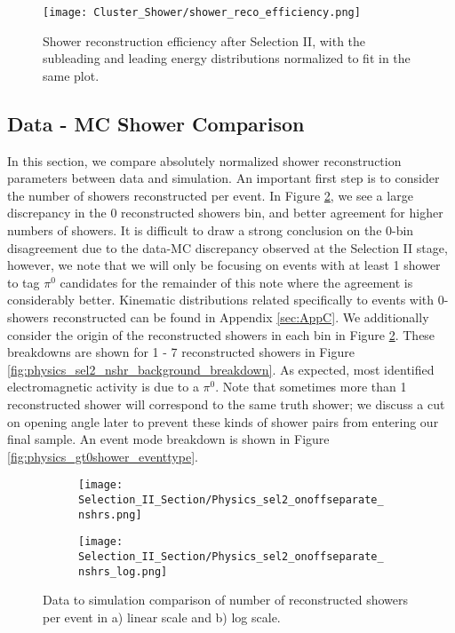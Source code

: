 \begin{figure}[h!]
\centering
\texttt{[image: Cluster\_Shower/shower\_reco\_efficiency.png]}
\caption{Shower reconstruction efficiency after Selection II, with the subleading and leading energy distributions normalized to fit in the same plot.  }
\label{fig:shower_reco_efficiency}
\end{figure}


\subsection{Data - MC Shower Comparison}

In this section, we compare absolutely normalized shower reconstruction parameters between data and simulation. An important first step is to consider the number of showers reconstructed per event.  In Figure \ref{fig:physics_sel2_nshrs}, we see a large discrepancy in the 0 reconstructed showers bin, and better agreement for higher numbers of showers. It is difficult to draw a strong conclusion on the 0-bin disagreement due to the data-MC discrepancy observed at the Selection II stage, however, we note that we will only be focusing on events with at least 1 shower to tag $\pi^0$ candidates for the remainder of this note where the agreement is considerably better. Kinematic distributions related specifically to events with 0-showers reconstructed can be found in Appendix \ref{sec:AppC}. We additionally consider the origin of the reconstructed showers in each bin in Figure \ref{fig:physics_sel2_nshrs}. These breakdowns are shown for 1 - 7 reconstructed showers in Figure \ref{fig:physics_sel2_nshr_background_breakdown}. As expected, most identified electromagnetic activity is due to a $\pi^0$. Note that sometimes more than 1 reconstructed shower will correspond to the same truth shower; we discuss a cut on opening angle later to prevent these kinds of shower pairs from entering our final sample.  An event mode breakdown is shown in Figure \ref{fig:physics_gt0shower_eventtype}.

% 
\begin{figure}[t!]
\centering
  \begin{subfigure}[t]{0.3\textwidth}
    \centering
\texttt{[image: Selection\_II\_Section/Physics\_sel2\_onoffseparate\_nshrs.png]}
  \caption{ }
  \end{subfigure} 
  \hspace{30 mm}
  \begin{subfigure}[t]{0.3\textwidth}
    \centering
\texttt{[image: Selection\_II\_Section/Physics\_sel2\_onoffseparate\_nshrs\_log.png]}
  \caption{ }
  \end{subfigure} 

\caption{ Data to simulation comparison of number of reconstructed showers per event in a) linear scale and b) log scale. }
\label{fig:physics_sel2_nshrs}
\end{figure}

